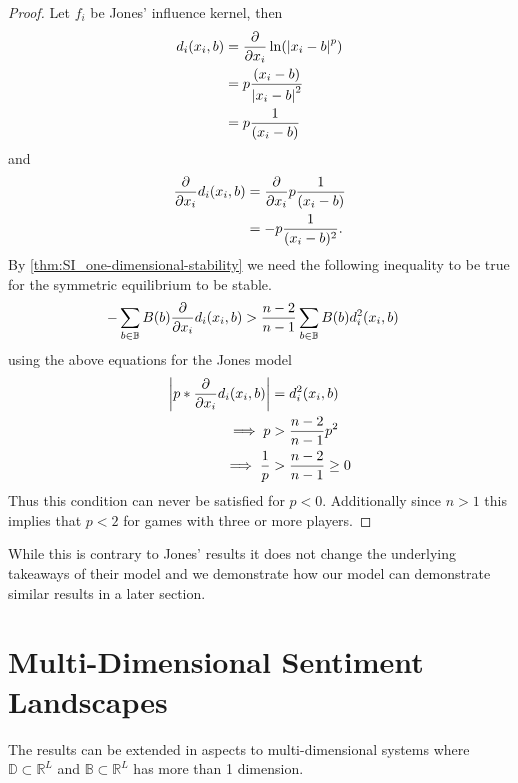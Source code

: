 \documentclass{article}
\newcommand {\R}{\mathbb{R}}
\newcommand {\D}{\mathbb{D}}
\newcommand {\B}{\mathbb{B}}
\begin{document}
                \begin{proof}
                    Let $f_i$ be Jones' influence kernel, then 
                    \begin{align}
                        d_i(x_i,b)&=\pdv{}{x_i}\ln(\abs{x_i-b}^p) \\ %
                        &=p\frac{(x_i-b)}{\abs{x_i-b}^2} \\ %
                        &=p\frac{1}{(x_i-b)}
                    \end{align}
                    and 
                    \begin{align}
                        \pdv{}{x_i}d_i(x_i,b)&=\pdv{}{x_i}p\frac{1}{(x_i-b)} \\ %
                        &=-p\frac{1}{(x_i-b)^2}.
                    \end{align}
                    By \cref{thm:SI_one-dimensional-stability} we need the following inequality to be true for the symmetric equilibrium to be stable. 
                    \begin{align}
                        -\sum_{b\in \B}B(b)\pdv{}{x_i}d_i(x_i,b)&>\frac{n-2}{n-1}\sum_{b\in \B}B(b)d_i^2(x_i,b)
                    \end{align}
                    using the above equations for the Jones model
                    \begin{align}
                        \abs{p*\pdv{}{x_i}d_i(x_i,b)}&=d_i^2(x_i,b) \\ %
                        \implies   p&>\frac{n-2}{n-1}p^2 \\ %
                        \implies  \frac{1}{p}&>\frac{n-2}{n-1}\geq 0
                    \end{align}
                    Thus this condition can never be satisfied for $p<0$. Additionally since $n>1$ this implies that $p<2$ for games with three or more players. 
                \end{proof}
                While this is contrary to Jones' results it does not change the underlying takeaways of their model and we demonstrate how our model can demonstrate similar results in a later section. 
                    
       
    
    \section{Multi-Dimensional Sentiment Landscapes}
        The results can be extended in aspects to multi-dimensional systems where $\D\subset \R^L$ and $\B\subset \R^L$ has more than 1 dimension. 
\end{document}
